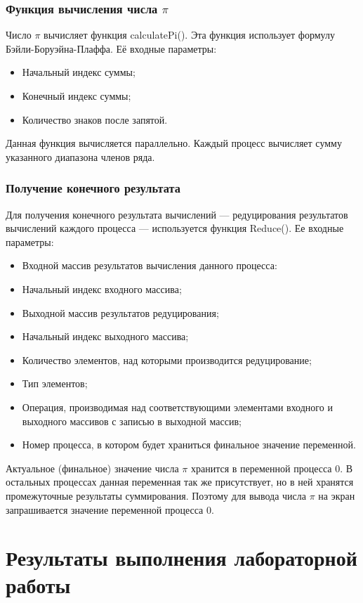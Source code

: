 \documentclass[titlepage,oneside,final,14pt]{extarticle} %
\begin{document}
\subsubsection{Функция вычисления числа $\pi$}

Число $\pi$ вычисляет функция calculatePi(). Эта функция использует формулу Бэйли-Боруэйна-Плаффа. Её входные параметры:
\begin{itemize}
	\item Начальный индекс суммы;
	\item Конечный индекс суммы;
	\item Количество знаков после запятой.
\end{itemize}

Данная функция вычисляется параллельно. Каждый процесс вычисляет сумму указанного диапазона членов ряда. 

\subsubsection{Получение конечного результата}

Для получения конечного результата вычислений --- редуцирования результатов вычислений каждого процесса --- используется функция Reduce(). Ее входные параметры:
\begin{itemize}
	\item Входной массив результатов вычисления данного процесса:
	\item Начальный индекс входного массива;
	\item Выходной массив результатов редуцирования;
	\item Начальный индекс выходного массива;
	\item Количество элементов, над которыми производится редуцирование;
	\item Тип элементов;
	\item Операция, производимая над соответствующими элементами входного и выходного массивов с записью в выходной массив;
	\item Номер процесса, в котором будет храниться финальное значение переменной.
\end{itemize}

Актуальное (финальное) значение числа $\pi$ хранится в переменной процесса 0. В остальных процессах данная переменная так же присутствует, но в ней хранятся промежуточные результаты суммирования. Поэтому для вывода числа $\pi$ на экран запрашивается значение переменной процесса 0. 

\section{Результаты выполнения лабораторной работы}
\end{document}
